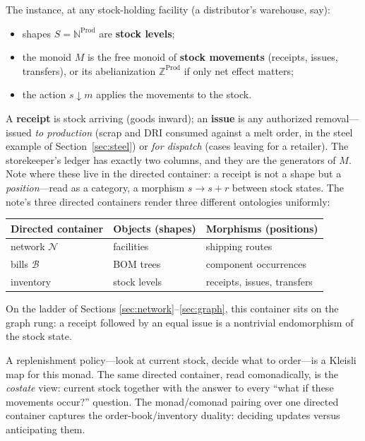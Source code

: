 \documentclass[11pt,a4paper]{article}
\newcommand{\N}{\mathcal{N}}
\newcommand{\B}{\mathcal{B}}
\newcommand{\dc}{\mathbin{\downarrow}}
\newcommand{\Prod}{\mathrm{Prod}}
\theoremstyle{plain}
\theoremstyle{definition}
\theoremstyle{remark}
\begin{document}
The instance, at any stock-holding facility (a distributor's
warehouse, say):
\begin{itemize}[nosep]
\item shapes $S = \mathbb{N}^{\Prod}$ are \textbf{stock levels};
\item the monoid $M$ is the free monoid of \textbf{stock movements}
  (receipts, issues, transfers), or its abelianization
  $\mathbb{Z}^{\Prod}$ if only net effect matters;
\item the action $s \dc m$ applies the movements to the stock.
\end{itemize}
A \textbf{receipt} is stock arriving (goods inward); an
\textbf{issue} is any authorized removal---issued \emph{to
production} (scrap and DRI consumed against a melt order, in the
steel example of Section~\ref{sec:steel}) or \emph{for
dispatch} (cases leaving for a retailer). The storekeeper's ledger
has exactly two columns, and they are the generators of $M$. Note
where these live in the directed container: a receipt is not a shape
but a \emph{position}---read as a category, a morphism
$s \to s + r$ between stock states. The note's three directed
containers render three different ontologies uniformly:

\begin{center}
\begin{tabular}{lll}
\toprule
Directed container & Objects (shapes) & Morphisms (positions) \\
\midrule
network $\N$ & facilities & shipping routes \\
bills $\B$ & BOM trees & component occurrences \\
inventory & stock levels & receipts, issues, transfers \\
\bottomrule
\end{tabular}
\end{center}

On the ladder of Sections \ref{sec:network}--\ref{sec:graph}, this
container sits on the graph rung: a receipt followed by an equal
issue is a nontrivial endomorphism of the stock state.

A replenishment policy---look at current stock, decide what to
order---is a Kleisli map for this monad. The same directed container,
read comonadically, is the \emph{costate} view: current stock together
with the answer to every ``what if these movements occur?'' question.
The monad/comonad pairing over one directed container captures the
order-book/inventory duality: deciding updates versus anticipating
them.
\end{document}
